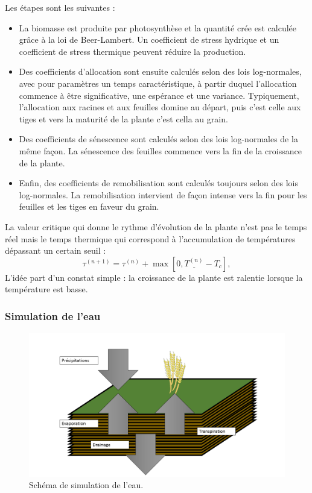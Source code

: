 Les étapes sont les suivantes : 

\begin{itemize}

\item La biomasse est produite par photosynthèse et la quantité crée est calculée grâce à la loi de Beer-Lambert.  Un coefficient de stress hydrique et un coefficient de stress thermique peuvent réduire la production.

\item Des coefficients d'allocation sont ensuite calculés selon des lois log-normales, avec pour paramètres un temps caractéristique, à partir duquel l'allocation commence à être significative, une espérance et une variance. Typiquement, l'allocation aux racines et aux feuilles domine au départ, puis c'est celle aux tiges et vers la maturité de la plante c'est cella au grain.

\item Des coefficients de sénescence sont calculés selon des lois log-normales de la même façon. La sénescence des feuilles commence vers la fin de la croissance de la plante.

\item Enfin, des coefficients de remobilisation sont calculés toujours selon des lois log-normales. La remobilisation intervient de façon intense vers la fin pour les feuilles et les tiges en faveur du grain.

\end{itemize}

La valeur critique qui donne le rythme d'évolution de la plante n'est pas le temps réel mais le temps thermique qui correspond à l'accumulation de températures dépassant un certain seuil :
\[
\tau^{(n+1)} = \tau^{(n)} + \max[0, \underline{T^{(n)}} - T_c], 
\]
L'idée part d'un constat simple : la croissance de la plante est ralentie lorsque la température est basse.

\subsubsection{Simulation de l'eau}

\begin{figure}[H]

\begin{center}
 \includegraphics[scale = 0.42]{./img/waterSchema.png}
 \caption{Schéma de simulation de l'eau.}
 \label{fig:waterModel}
\end{center}

\end{figure}

